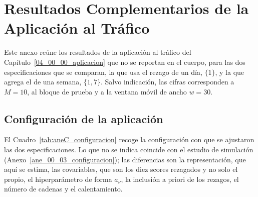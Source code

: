 \chapter{Resultados Complementarios de la Aplicación al Tráfico}
\label{aneC_00_00_trafico}


Este anexo reúne los resultados de la aplicación al tráfico del Capítulo~\ref{04_00_00_aplicacion} que no se reportan en el cuerpo, para las dos especificaciones que se comparan, la que usa el rezago de un día, $\{1\}$, y la que agrega el de una semana, $\{1,7\}$. Salvo indicación, las cifras corresponden a $M = 10$, al bloque de prueba y a la ventana móvil de ancho $w = 30$.

\section{Configuración de la aplicación}
\label{aneC_00_01_configuracion}

El Cuadro~\ref{tab:aneC_configuracion} recoge la configuración con que se ajustaron las dos especificaciones. Lo que no se indica coincide con el estudio de simulación (Anexo~\ref{ane_00_03_configuracion}); las diferencias son la representación, que aquí se estima, las covariables, que son los diez scores rezagados y no solo el propio, el hiperparámetro de forma $a_\nu$, la inclusión a priori de los rezagos, el número de cadenas y el calentamiento.

